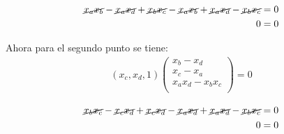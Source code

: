 \begin{align*}
\cancel{x_a x_b} -\cancel{x_a x_d} + \cancel{x_b x_c} - \cancel{x_a x_b} + \cancel{x_a x_d} - \cancel{x_b x_c} &=0\\
0 &= 0
\end{align*} 

Ahora para el segundo punto se tiene:
\begin{align*}
(x_c, x_d, 1) 
\begin{pmatrix}
    x_b -x_d \\
    x_c -x_a \\
    x_a x_d - x_b x_c \\
\end{pmatrix}
= 0
\end{align*} 

\begin{align*}
\cancel{x_b x_c} -\cancel{x_c x_d} + \cancel{x_c x_d} - \cancel{x_a x_d} + \cancel{x_a x_d} - \cancel{x_b x_c} &=0\\
0 &= 0
\end{align*} 


